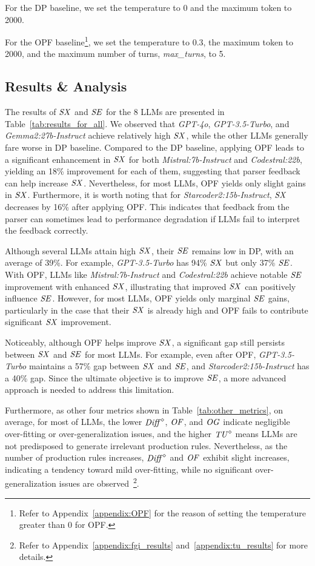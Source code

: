For the DP baseline, we set the temperature to 0 and the maximum token to 2000.  

For the OPF baseline\footnote{Refer to Appendix~\ref{appendix:OPF} for the reason of setting the temperature greater than 0 for OPF.}, we set the temperature to 0.3, the maximum token to 2000, and the maximum number of turns, \textit{max\_turns}, to 5.


\subsection{Results \& Analysis}
The results of $\mathit{SX}$ and $\mathit{SE}$ for the 8 LLMs are presented in Table~\ref{tab:results_for_all}. We observed that \textit{GPT-4o}, \textit{GPT-3.5-Turbo}, and \textit{Gemma2:27b-Instruct} achieve relatively high $\mathit{SX}$, while the other LLMs generally fare worse in DP baseline. Compared to the DP baseline, applying OPF leads to a significant enhancement in $\mathit{SX}$ for both \textit{Mistral:7b-Instruct} and \textit{Codestral:22b}, yielding an 18\% improvement for each of them, suggesting that parser feedback can help increase $\mathit{SX}$. Nevertheless, for most LLMs, OPF yields only slight gains in $\mathit{SX}$. Furthermore, it is worth noting that for \textit{Starcoder2:15b-Instruct}, $\mathit{SX}$ decreases by 16\% after applying OPF. This indicates that feedback from the parser can sometimes lead to performance degradation if LLMs fail to interpret the feedback correctly. 

Although several LLMs attain high $\mathit{SX}$, their $\mathit{SE}$ remains low in DP, with an average of 39\%. For example, \textit{GPT-3.5-Turbo} has 94\% $\mathit{SX}$ but only 37\% $\mathit{SE}$. With OPF, LLMs like \textit{Mistral:7b-Instruct} and \textit{Codestral:22b} achieve notable $\mathit{SE}$ improvement with enhanced $\mathit{SX}$, illustrating that improved $\mathit{SX}$ can positively influence $\mathit{SE}$. However, for most LLMs, OPF yields only marginal $\mathit{SE}$ gains, particularly in the case that their $\mathit{SX}$ is already high and OPF fails to contribute significant $\mathit{SX}$ improvement.

Noticeably, although OPF helps improve $\mathit{SX}$, a significant gap still persists between $\mathit{SX}$ and $\mathit{SE}$ for most LLMs. For example, even after OPF, \textit{GPT-3.5-Turbo} maintains a 57\% gap between $\mathit{SX}$ and $\mathit{SE}$, and \textit{Starcoder2:15b-Instruct} has a 40\% gap. Since the ultimate objective is to improve $\mathit{SE}$, a more advanced approach is needed to address this limitation.

Furthermore, as other four metrics shown in Table~\ref{tab:other_metrics}, on average, for most of LLMs, the lower ${\mathit{Diff}}^\diamond$, $\mathit{OF}$, and $\mathit{OG}$ indicate negligible over-fitting or over-generalization issues, and the higher $\mathit{TU}^\diamond$ means LLMs are not predisposed to generate irrelevant production rules. Nevertheless, as the number of production rules increases, ${\mathit{Diff}}^\diamond$ and $\mathit{OF}$ exhibit slight increases, indicating a tendency toward mild over-fitting, while no significant over-generalization issues are observed~\footnote{Refer to Appendix~\ref{appendix:fgi_results} and~\ref{appendix:tu_results} for more details.}.

